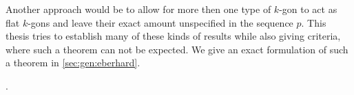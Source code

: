 Another approach would be to allow for more then one type of $k$-gon to act as flat $k$-gons and leave their exact amount unspecified in the sequence $p$. This thesis tries to establish many of these kinds of results while also giving criteria, where such a theorem can not be expected. We give an exact formulation of such a theorem in \autoref{sec:gen:eberhard}.


.